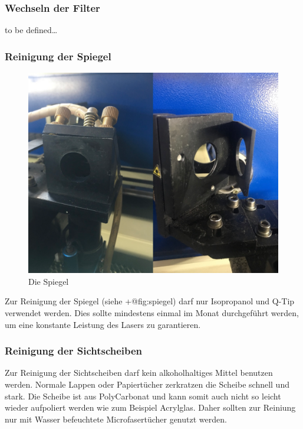 \documentclass[]{article}
\begin{document}
\hypertarget{wechseln-der-filter}{%
\subsubsection{Wechseln der Filter}\label{wechseln-der-filter}}

to be defined\ldots{}

\hypertarget{reinigung-der-spiegel}{%
\subsubsection{Reinigung der Spiegel}\label{reinigung-der-spiegel}}

\begin{figure}
\hypertarget{fig:spiegel}{%
\centering
\includegraphics{assets/images/laser-spiegel.png}
\caption{Die Spiegel}\label{fig:spiegel}
}
\end{figure}

Zur Reinigung der Spiegel (siehe +@fig:spiegel) darf nur Isopropanol und
Q-Tip verwendet werden. Dies sollte mindestens einmal im Monat
durchgeführt werden, um eine konstante Leistung des Lasers zu
garantieren.

\hypertarget{reinigung-der-sichtscheiben}{%
\subsubsection{Reinigung der
Sichtscheiben}\label{reinigung-der-sichtscheiben}}

Zur Reinigung der Sichtscheiben darf kein alkoholhaltiges Mittel
benutzen werden. Normale Lappen oder Papiertücher zerkratzen die Scheibe
schnell und stark. Die Scheibe ist aus PolyCarbonat und kann somit auch
nicht so leicht wieder aufpoliert werden wie zum Beispiel Acrylglas.
Daher sollten zur Reiniung nur mit Wasser befeuchtete Microfasertücher
genutzt werden.
\end{document}
